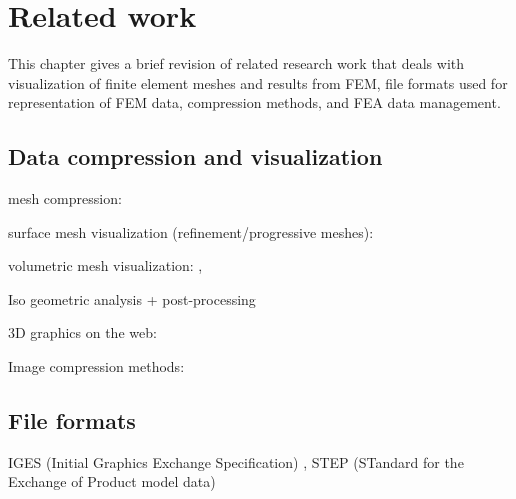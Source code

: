 \chapter{Related work}
\label{chapter:related-work}

This chapter gives a brief revision of related research work that deals with visualization of finite element meshes and results from FEM, file formats used for representation of FEM data, compression methods, and FEA data management.


\section{Data compression and visualization}

mesh compression:

surface mesh visualization (refinement/progressive meshes):
\cite{Gudukbay2002}
\cite{Vasa2011}
\cite{Alliez2001}
\cite{Maglo2012}
\cite{Valette2004}

\cite{Hoppe1996}


volumetric mesh visualization:
\cite{Ueng2004}, \cite{Robaina2010}

Iso geometric analysis + post-processing
\cite{Stahl2017}

3D graphics on the web:
\cite{Evans2014}

Image compression methods:
\cite{Lui2001}
\cite{Watson1994}

\section{File formats}
IGES (Initial Graphics Exchange Specification) \cite{Groton2006}, STEP (STandard for the Exchange of Product model data) \cite{Pratt2001}

